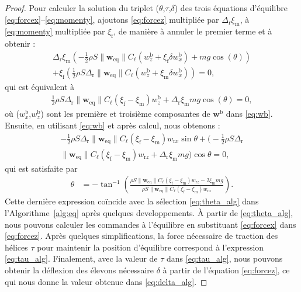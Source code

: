 \begin{proof}
        Pour calculer la solution du triplet ($\theta$,$\tau$,$\delta$) des trois équations d'équilibre \eqref{eq:forcex}--\eqref{eq:momenty}, ajoutons \eqref{eq:forcez} multipliée par $\Delta_{\text{r}} \xi_{\text{m}}$, à \eqref{eq:momenty} multipliée par $\xi_{\text{f}}$, de manière à annuler le premier terme et à obtenir : 
        \begin{multline*}
            \Delta_{\text{r}} \xi_{\text{m}} \left( - \frac{1}{2}\rho S \lVert \boldsymbol{w}_{\mathrm{eq}} \rVert C_{\ell} (w_{z}^{\text{b}} + \xi_{\text{f}} \delta w_{x}^{\text{b}}) + mg \cos(\theta) \right) \\+ \xi_{\text{f}} \left(\frac{1}{2}\rho S  \Delta_{\text{r}} \lVert \boldsymbol{w}_{\mathrm{eq}} \rVert C_{\ell} (w_{z}^{\text{b}} + \xi_{\text{m}} \delta w_{x}^{\text{b}})  \right) = 0,
        \end{multline*}
        qui est équivalent à
        \begin{align*}
            \frac{1}{2}\rho S  \Delta_{\text{r}} \lVert \boldsymbol{w}_{\mathrm{eq}} \rVert C_{\ell}  (\xi_{\text{f}} - \xi_{\text{m}}) w_{z}^{\text{b}} +   \Delta_{\text{r}} \xi_{\text{m}} mg \cos(\theta)  = 0,
        \end{align*}
        où ($w_{x}^{\text{b}}$,$w_{z}^{\text{b}}$) sont les première et troisième composantes de $\boldsymbol{w}^{\text{b}}$ dans \eqref{eq:wb}. Ensuite, en utilisant \eqref{eq:wb} et après calcul, nous obtenons : 
        \begin{multline*}
                -\frac{1}{2}\rho S  \Delta_{\text{r}} \lVert \boldsymbol{w}_{\mathrm{eq}} \rVert C_{\ell}  (\xi_{\text{f}} - \xi_{\text{m}}) w_{\text{r}x} \sin{\theta}  +\bigg( -\frac{1}{2}\rho S  \Delta_{\text{r}} \\ \lVert \boldsymbol{w}_{\mathrm{eq}} \rVert C_{\ell}  (\xi_{\text{f}} - \xi_{\text{m}})w_{\text{r}z} +   \Delta_{\text{r}} \xi_{\text{m}} mg \bigg) \cos{\theta} = 0,
        \end{multline*}
        qui est satisfaite par
            \begin{align} \label{eq:theta}
                \theta &=  -\tan^{-1}\left(\frac{\rho S \lVert \boldsymbol{w}_{\mathrm{eq}} \rVert C_{\ell}  (\xi_{\text{f}} - \xi_{\text{m}})w_{\text{r}z} - 2 \xi_{\text{m}} mg }{\rho S\lVert \boldsymbol{w}_{\mathrm{eq}} \rVert C_{\ell}  (\xi_{\text{f}} - \xi_{\text{m}}) w_{\text{r}x}}\right).
            \end{align}
            Cette dernière expression coïncide avec la sélection \eqref{eq:theta_alg} dans l'Algorithme~\ref{alg:eq} après quelques developpements.
        À partir de \eqref{eq:theta_alg}, nous pouvons calculer les commandes à l'équilibre en substituant \eqref{eq:forcex} dans \eqref{eq:forcez}. Après quelques simplifications, la force nécessaire de traction des hélices  $\tau$ pour maintenir la position d'équilibre correspond à l'expression  \eqref{eq:tau_alg}. Finalement, avec la valeur de $\tau$ dans \eqref{eq:tau_alg}, nous pouvons obtenir la déflexion des élevons nécessaire $\delta$ à partir de l'équation \eqref{eq:forcez}, ce qui nous donne la valeur obtenue dans \eqref{eq:delta_alg}.
    \end{proof}
